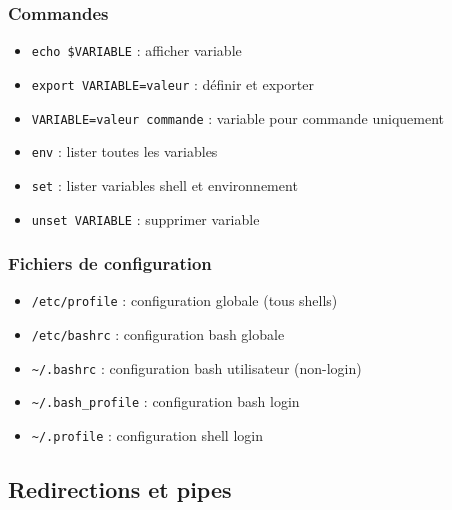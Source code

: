 \documentclass[12pt,a4paper]{article}
\begin{document}
\subsubsection{Commandes}
\begin{itemize}
    \item \texttt{echo \$VARIABLE} : afficher variable %
    \item \texttt{export VARIABLE=valeur} : d\'efinir et exporter %
    \item \texttt{VARIABLE=valeur commande} : variable pour commande uniquement %
    \item \texttt{env} : lister toutes les variables %
    \item \texttt{set} : lister variables shell et environnement %
    \item \texttt{unset VARIABLE} : supprimer variable %
\end{itemize}

\subsubsection{Fichiers de configuration}
\begin{itemize}
    \item \texttt{/etc/profile} : configuration globale (tous shells) %
    \item \texttt{/etc/bashrc} : configuration bash globale %
    \item \texttt{\textasciitilde/.bashrc} : configuration bash utilisateur (non-login) %
    \item \texttt{\textasciitilde/.bash\_profile} : configuration bash login %
    \item \texttt{\textasciitilde/.profile} : configuration shell login %
\end{itemize}


\subsection{Redirections et pipes}
\end{document}
